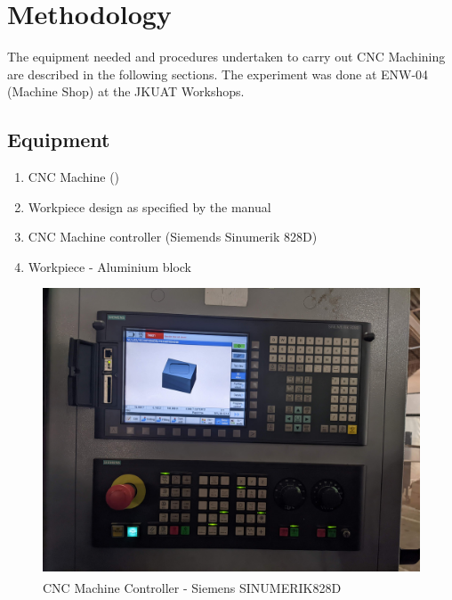 \chapter{Methodology}
\lhead{\leftmark}
The equipment needed and procedures undertaken to carry out CNC Machining are described in the following sections. The experiment was done at ENW-04 (Machine Shop) at the JKUAT Workshops.
\section{Equipment}
\begin{enumerate}
\item CNC Machine ()
\item Workpiece design as specified by the manual
\item CNC Machine controller (Siemends Sinumerik 828D)
\item Workpiece - Aluminium block 
\end{enumerate}
\begin{figure}[h!]
	\centering
	\includegraphics[width=0.7\linewidth]{Figures/machinecontroller}
	\caption[CNC Machine Controller]{CNC Machine Controller - Siemens SINUMERIK\textsuperscript\textregistered 828D} 
	\label{fig:cnccontroller}
\end{figure}
